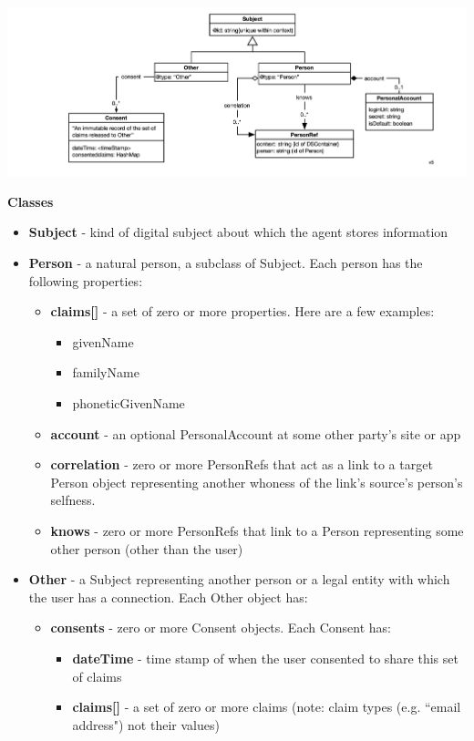 \documentclass[11pt, oneside]{article}   	%
\begin{document}
\includegraphics[width=\textwidth]{./images/persona-classes.png}

\textbf{Classes}

\begin{itemize}
\item \textbf{Subject} - kind of digital subject about which the agent stores information
\item \textbf{Person} - a natural person, a subclass of Subject. Each person has the following properties:
	\begin{itemize}
	\item \textbf{claims[]} - a set of zero or more properties. Here are a few examples: 
		\begin{itemize}
		\item givenName
		\item familyName
		\item phoneticGivenName
		\end{itemize}
	\item \textbf{account} - an optional PersonalAccount at some other party's site or app
	\item \textbf{correlation} - zero or more PersonRefs that act as a link to a target Person object representing another whoness of the link's source's person's selfness.
	\item \textbf{knows} - zero or more PersonRefs that link to a Person representing some other person (other than the user)
	\end{itemize}
\item \textbf{Other} - a Subject representing another person or a legal entity with which the user has a connection. Each Other object has:
	\begin {itemize}
	\item \textbf{consents} - zero or more Consent objects. Each Consent has:
		\begin{itemize}
		\item \textbf{dateTime} - time stamp of when the user consented to share this set of claims
		\item \textbf{claims[]}  - a set of zero or more claims (note: claim types (e.g. ``email address") not their values)
		\end{itemize}
	\end{itemize}
\end{itemize}
\end{document}
